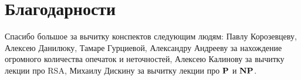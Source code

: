 \documentclass[a4paper, 12pt]{article}
\begin{document}
\section*{Благодарности}

Спасибо большое за вычитку конспектов следующим людям: Павлу Корозевцеву, Алексею
Данилюку, Тамаре Гурциевой, Александру Андрееву за
нахождение огромного количества опечаток и неточностей, Алексею Калинову
за вычитку лекции про RSA, Михаилу Дискину за
вычитку лекции про $\mathbf{P}$ и $\mathbf{NP}$.
\end{document}
